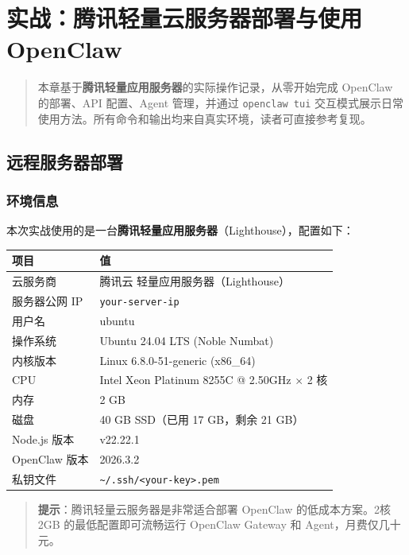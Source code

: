 \chapter{实战：腾讯轻量云服务器部署与使用 OpenClaw}

\begin{quote}
本章基于\textbf{腾讯轻量应用服务器}的实际操作记录，从零开始完成 OpenClaw 的部署、API 配置、Agent 管理，并通过 \texttt{openclaw tui} 交互模式展示日常使用方法。所有命令和输出均来自真实环境，读者可直接参考复现。
\end{quote}

\section{远程服务器部署}


\subsection{环境信息}

本次实战使用的是一台\textbf{腾讯轻量应用服务器}（Lighthouse），配置如下：

\begin{table}[h]
\centering
\small
\begin{tabular}{|l|p{}|}
\hline
项目 & 值 \\
\hline
云服务商 & 腾讯云 轻量应用服务器（Lighthouse） \\
\hline
服务器公网 IP & \texttt{your-server-ip} \\
\hline
用户名 & ubuntu \\
\hline
操作系统 & Ubuntu 24.04 LTS (Noble Numbat) \\
\hline
内核版本 & Linux 6.8.0-51-generic (x86\_64) \\
\hline
CPU & Intel Xeon Platinum 8255C @ 2.50GHz $\times$ 2 核 \\
\hline
内存 & 2 GB \\
\hline
磁盘 & 40 GB SSD（已用 17 GB，剩余 21 GB） \\
\hline
Node.js 版本 & v22.22.1 \\
\hline
OpenClaw 版本 & 2026.3.2 \\
\hline
私钥文件 & \texttt{\textasciitilde{}/.ssh/<your-key>.pem} \\
\hline
\end{tabular}
\end{table}

\begin{quote}
\textbf{提示}：腾讯轻量云服务器是非常适合部署 OpenClaw 的低成本方案。2核2GB 的最低配置即可流畅运行 OpenClaw Gateway 和 Agent，月费仅几十元。
\end{quote}

